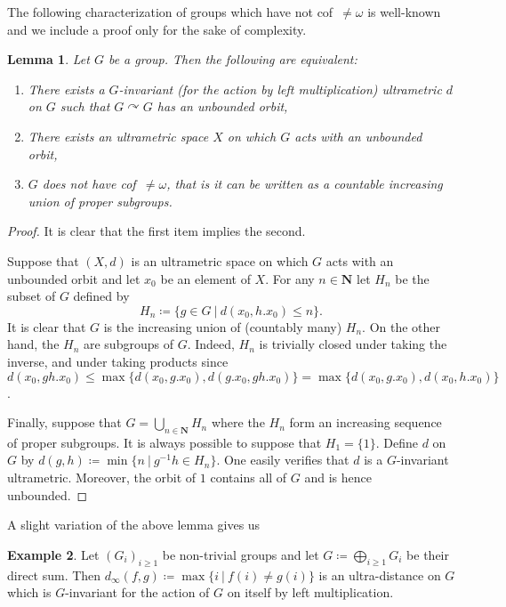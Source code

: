 \documentclass[a4paper]{article}
\newtheorem{lem}{Lemma}[section]
\theoremstyle{definition}
\newtheorem{exmp}[lem]{Example}
\newcommand*{\field}[1]{\mathbf{#1}}
\newcommand*{\N}{\field{N}}
\newcommand{\setst}[2]{\{#1\ |\ #2\}}
\begin{document}
The following characterization of groups which have not cof~$\neq\omega$ is well-known and we include a proof only for the sake of complexity.
%
%
\begin{lem}\label{Lemma:CofSub}
Let $G$ be a group. Then the following are equivalent:
\begin{enumerate}
\item There exists a $G$-invariant (for the action by left multiplication) ultrametric $d$ on $G$ such that $G\curvearrowright G$ has an unbounded orbit,
\item There exists an ultrametric space $X$ on which $G$ acts with an unbounded orbit,
\item $G$ does not have cof~$\neq\omega$, that is it can be written as a countable increasing union of proper subgroups.
\end{enumerate}
\end{lem}
\begin{proof}
It is clear that the first item implies the second.

Suppose that $(X,d)$ is an ultrametric space on which $G$ acts with an unbounded orbit and let $x_0$ be an element of $X$. For any $n\in \N$ let $H_n$ be the subset of $G$ defined by
\[
	H_n\coloneqq\setst{g\in G}{d(x_0,h.x_0)\leq n}.
\]
It is clear that $G$ is the increasing union of (countably many) $H_n$.
On the other hand, the $H_n$ are subgroups of $G$. Indeed, $H_n$ is trivially closed under taking the inverse, and under taking products since $d(x_0,gh.x_0)\leq\max\{d(x_0,g.x_0),d(g.x_0,gh.x_0)\}=\max\{d(x_0,g.x_0),d(x_0,h.x_0)\}$.

Finally, suppose that $G=\bigcup_{n\in \N}H_n$ where the $H_n$ form an increasing sequence of proper subgroups. It is always possible to suppose that $H_1=\{1\}$.
Define $d$ on $G$ by $d(g,h)\coloneqq\min\setst{n}{g^{-1}h\in H_n}$.
One easily verifies that $d$ is a $G$-invariant ultrametric. Moreover, the orbit of $1$ contains all of $G$ and is hence unbounded.
\end{proof}
%
%
A slight variation of the above lemma gives us
\begin{exmp}\label{Exmpl:Ultra}
Let $(G_i)_{i\geq 1}$ be non-trivial groups and let $G\coloneqq\bigoplus_{i\geq 1} G_i$ be their direct sum.
Then $d_\infty(f,g)\coloneqq\max\setst{i}{f(i)\neq g(i)}$ is an ultra-distance on $G$ which is $G$-invariant for the action of $G$ on itself by left multiplication.
\end{exmp}
\end{document}
